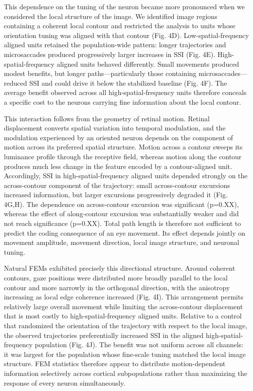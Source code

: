 \documentclass{lite}
\begin{document}
This dependence on the tuning of the neuron became more pronounced when we considered the local structure of the image. We identified image regions containing a coherent local contour and restricted the analysis to units whose orientation tuning was aligned with that contour (Fig. 4D). Low-spatial-frequency aligned units retained the population-wide pattern: longer trajectories and microsaccades produced progressively larger increases in SSI (Fig. 4E). High-spatial-frequency aligned units behaved differently. Small movements produced modest benefits, but longer paths—particularly those containing microsaccades—reduced SSI and could drive it below the stabilized baseline (Fig. 4F). The average benefit observed across all high-spatial-frequency units therefore conceals a specific cost to the neurons carrying fine information about the local contour.

This interaction follows from the geometry of retinal motion. Retinal displacement converts spatial variation into temporal modulation, and the modulation experienced by an oriented neuron depends on the component of motion across its preferred spatial structure. Motion across a contour sweeps its luminance profile through the receptive field, whereas motion along the contour produces much less change in the feature encoded by a contour-aligned unit. Accordingly, SSI in high-spatial-frequency aligned units depended strongly on the across-contour component of the trajectory: small across-contour excursions increased information, but larger excursions progressively degraded it (Fig. 4G,H). The dependence on across-contour excursion was significant (p=0.XX), whereas the effect of along-contour excursion was substantially weaker and did not reach significance (p=0.XX). Total path length is therefore not sufficient to predict the coding consequence of an eye movement. Its effect depends jointly on movement amplitude, movement direction, local image structure, and neuronal tuning.

Natural FEMs exhibited precisely this directional structure. Around coherent contours, gaze positions were distributed more broadly parallel to the local contour and more narrowly in the orthogonal direction, with the anisotropy increasing as local edge coherence increased (Fig. 4I). This arrangement permits relatively large overall movement while limiting the across-contour displacement that is most costly to high-spatial-frequency aligned units. Relative to a control that randomized the orientation of the trajectory with respect to the local image, the observed trajectories preferentially increased SSI in the aligned high-spatial-frequency population (Fig. 4J). The benefit was not uniform across all channels: it was largest for the population whose fine-scale tuning matched the local image structure. FEM statistics therefore appear to distribute motion-dependent information selectively across cortical subpopulations rather than maximizing the response of every neuron simultaneously.
\end{document}

